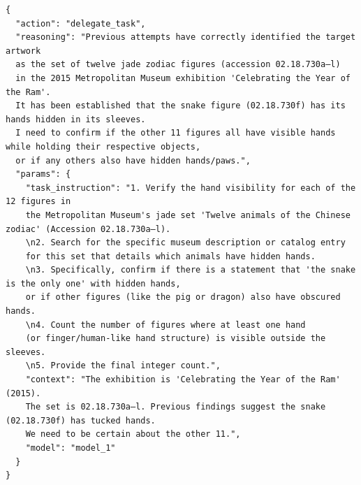 \begin{tcolorbox}[
  title={\textbf{\small Attempt 8 - Main Decision}},
  boxrule=1pt,
  arc=0mm,
  colback=gray!5,
  colframe=gray!70,
  breakable,
  before skip=10pt,
  after skip=10pt,
  pad at break=2mm,
  parbox=false
]
\begin{verbatim}
{
  "action": "delegate_task",
  "reasoning": "Previous attempts have correctly identified the target artwork 
  as the set of twelve jade zodiac figures (accession 02.18.730a–l) 
  in the 2015 Metropolitan Museum exhibition 'Celebrating the Year of the Ram'. 
  It has been established that the snake figure (02.18.730f) has its hands hidden in its sleeves. 
  I need to confirm if the other 11 figures all have visible hands while holding their respective objects, 
  or if any others also have hidden hands/paws.",
  "params": {
    "task_instruction": "1. Verify the hand visibility for each of the 12 figures in 
    the Metropolitan Museum's jade set 'Twelve animals of the Chinese zodiac' (Accession 02.18.730a–l).
    \n2. Search for the specific museum description or catalog entry 
    for this set that details which animals have hidden hands. 
    \n3. Specifically, confirm if there is a statement that 'the snake is the only one' with hidden hands, 
    or if other figures (like the pig or dragon) also have obscured hands.
    \n4. Count the number of figures where at least one hand 
    (or finger/human-like hand structure) is visible outside the sleeves.
    \n5. Provide the final integer count.",
    "context": "The exhibition is 'Celebrating the Year of the Ram' (2015). 
    The set is 02.18.730a–l. Previous findings suggest the snake (02.18.730f) has tucked hands.
    We need to be certain about the other 11.",
    "model": "model_1"
  }
}
\end{verbatim}
\end{tcolorbox}


